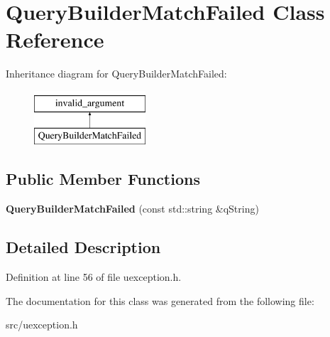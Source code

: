 \hypertarget{class_query_builder_match_failed}{}\section{Query\+Builder\+Match\+Failed Class Reference}
\label{class_query_builder_match_failed}
Inheritance diagram for Query\+Builder\+Match\+Failed\+:\begin{figure}[H]
\begin{center}
\leavevmode
\includegraphics[height=2.000000cm]{class_query_builder_match_failed}
\end{center}
\end{figure}
\subsection*{Public Member Functions}
\begin{DoxyCompactItemize}
\item 
\mbox{\label{class_query_builder_match_failed_a821b77ae435862c21634f1e7919210a4}} 
{\bfseries Query\+Builder\+Match\+Failed} (const std\+::string \&q\+String)
\end{DoxyCompactItemize}


\subsection{Detailed Description}


Definition at line 56 of file uexception.\+h.



The documentation for this class was generated from the following file\+:\begin{DoxyCompactItemize}
\item 
src/uexception.\+h\end{DoxyCompactItemize}
